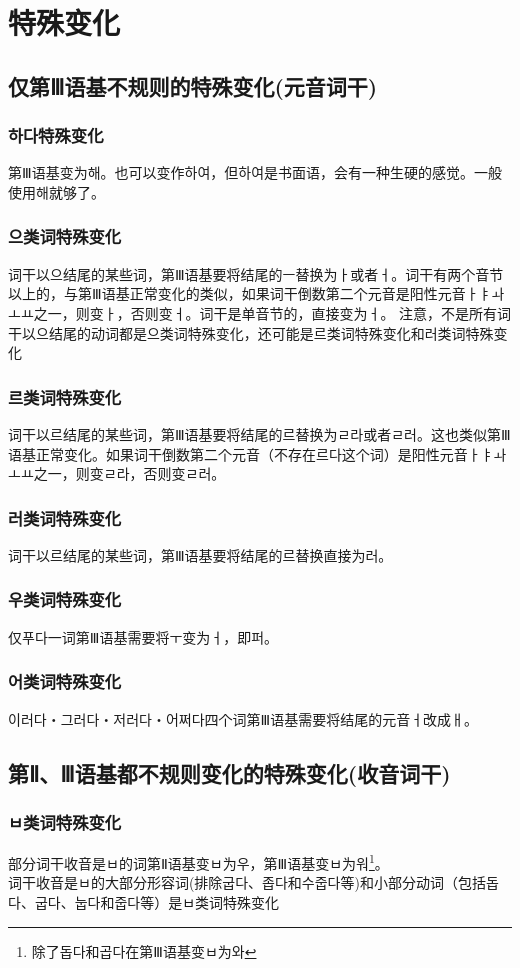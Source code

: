 \section{特殊变化}\label{eogi:bk}
\subsection{仅第Ⅲ语基不规则的特殊变化(元音词干)}
\subsubsection{하다特殊变化}\label{eogi:hata}
第Ⅲ语基变为해。也可以变作하여，但하여是书面语，会有一种生硬的感觉。一般使用해就够了。
\subsubsection{으类词特殊变化}\label{eogi:eu}
词干以으结尾的某些词，第Ⅲ语基要将结尾的ㅡ替换为ㅏ或者ㅓ。词干有两个音节以上的，与第Ⅲ语基正常变化的类似，如果词干倒数第二个元音是阳性元音ㅏㅑㅘㅗㅛ之一，则变ㅏ，否则变ㅓ。词干是单音节的，直接变为ㅓ。{\color{red} 注意，不是所有词干以으结尾的动词都是으类词特殊变化，还可能是르类词特殊变化和러类词特殊变化}
\subsubsection{르类词特殊变化}%
词干以르结尾的某些词，第Ⅲ语基要将结尾的르替换为ㄹ라或者ㄹ러。这也类似第Ⅲ语基正常变化。如果词干倒数第二个元音（不存在르다这个词）是阳性元音ㅏㅑㅘㅗㅛ之一，则变ㄹ라，否则变ㄹ러。
\subsubsection{러类词特殊变化}%
词干以르结尾的某些词，第Ⅲ语基要将结尾的르替换直接为러。
\subsubsection{우类词特殊变化}\label{eogi:u}
仅푸다一词第Ⅲ语基需要将ㅜ变为ㅓ，即퍼。
\subsubsection{어类词特殊变化}\label{eogi:eo}
이러다・그러다・저러다・어쩌다四个词第Ⅲ语基需要将结尾的元音ㅓ改成ㅐ。
\subsection{第Ⅱ、Ⅲ语基都不规则变化的特殊变化(收音词干)}
\subsubsection{ㅂ类词特殊变化}
部分词干收音是ㅂ的词第Ⅱ语基变ㅂ为우，第Ⅲ语基变ㅂ为워\footnote{除了돕다和곱다在第Ⅲ语基变ㅂ为와}。
\\\indent 词干收音是ㅂ的大部分形容词(排除굽다、좁다和수줍다等)和小部分动词（包括돕다、굽다、눕다和줍다等）是ㅂ类词特殊变化
